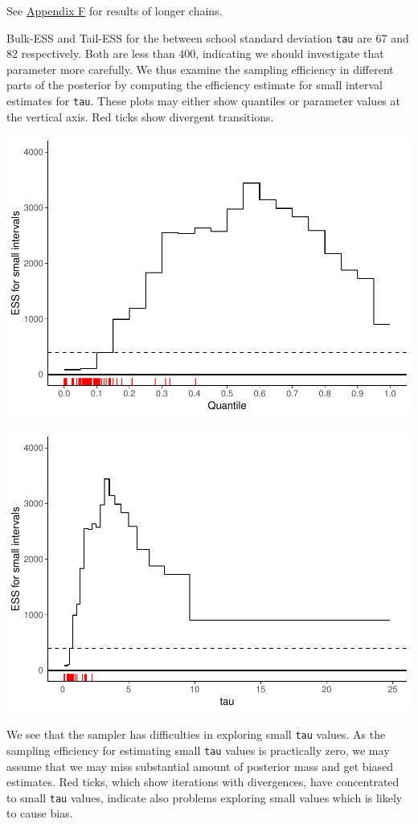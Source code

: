 \documentclass[american,]{article}
\begin{document}
See \protect\hyperlink{AppendixF}{Appendix F} for results of longer
chains.

Bulk-ESS and Tail-ESS for the between school standard deviation
\texttt{tau} are 67 and 82 respectively. Both are less than 400,
indicating we should investigate that parameter more carefully. We thus
examine the sampling efficiency in different parts of the posterior by
computing the efficiency estimate for small interval estimates for
\texttt{tau}. These plots may either show quantiles or parameter values
at the vertical axis. Red ticks show divergent transitions.

\includegraphics{graphics/local-ess-fit-cp-1.pdf}

\includegraphics{graphics/local-ess-fit-cp-norank-1.pdf}

We see that the sampler has difficulties in exploring small \texttt{tau}
values. As the sampling efficiency for estimating small \texttt{tau}
values is practically zero, we may assume that we may miss substantial
amount of posterior mass and get biased estimates. Red ticks, which show
iterations with divergences, have concentrated to small \texttt{tau}
values, indicate also problems exploring small values which is likely to
cause bias.
\end{document}
